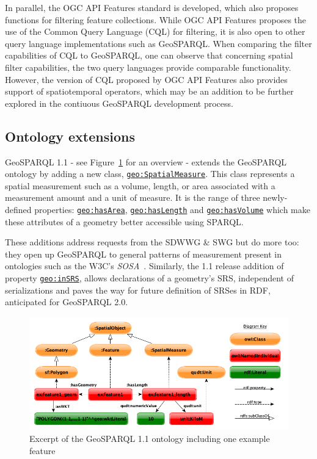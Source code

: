\documentclass[runningheads]{llncs}
\begin{document}
In parallel, the OGC API Features standard \cite{ogcapifeaturespart3} is developed, which also proposes functions for filtering feature collections. While OGC API Features proposes the use of the Common Query Language (CQL) for filtering, it is also open to other query language implementations such as GeoSPARQL. When comparing the filter capabilities of CQL to GeoSPARQL, one can observe that concerning spatial filter capabilities, the two query languages provide comparable functionality. However, the version of CQL proposed by OGC API Features also provides support of spatiotemporal operators, which may be an addition to be further explored in the contiuous GeoSPARQL development process.

\subsection{Ontology extensions}\label{sec:ontexts}
GeoSPARQL 1.1 - see Figure~\ref{fig:geosparql11ontology} for an overview - extends the GeoSPARQL ontology by adding a new class, \href{http://www.opengis.net/ont/geosparql#SpatialMeasure}{\texttt{geo:SpatialMeasure}}. This class represents a spatial measurement 
such as a volume, length, or area associated with a measurement amount and a unit of measure. It is the range of three newly-defined properties:
\href{http://www.opengis.net/ont/geosparql#hasArea}{\texttt{geo:hasArea}}, \href{http://www.opengis.net/ont/geosparql#hasLength}{\texttt{geo:hasLength}} and \href{http://www.opengis.net/ont/geosparql#hasVolume}{\texttt{geo:hasVolume}} which make these attributes of a geometry better accessible using 
SPARQL. 

These additions address requests from the SDWWG \& SWG but
do more too: they open up GeoSPARQL to general patterns of measurement present in ontologies 
such as the W3C's \textit{SOSA}~\cite{haller_semantic_2017}. Similarly, 
the 1.1 release addition of property \href{http://www.opengis.net/def/function/geosparql/inSRS}{\texttt{geo:inSRS}}, allows declarations of a geometry's SRS, independent of serializations and paves the way 
for future definition of SRSes in RDF, anticipated for GeoSPARQL 2.0.

\begin{figure}[htb]
    \centering
    \includegraphics[width=\linewidth]{images/geold_ontology.png}
    \caption{Excerpt of the GeoSPARQL 1.1 ontology including one example feature}
    \label{fig:geosparql11ontology}
\end{figure}
\end{document}
